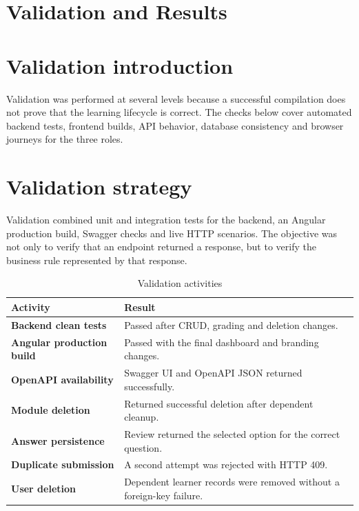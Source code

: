 \section{Validation and Results}
\section*{Validation introduction}
Validation was performed at several levels because a successful compilation
does not prove that the learning lifecycle is correct. The checks below cover
automated backend tests, frontend builds, API behavior, database consistency
and browser journeys for the three roles.

\section{Validation strategy}
Validation combined unit and integration tests for the backend, an Angular
production build, Swagger checks and live HTTP scenarios. The objective was
not only to verify that an endpoint returned a response, but to verify the
business rule represented by that response.

\begin{table}[H]\centering
\caption{Validation activities}\label{tab:validation}
\begin{tabularx}{\textwidth}{>{\bfseries}p{}X}
\toprule Activity & Result\\\midrule
Backend clean tests & Passed after CRUD, grading and deletion changes.\\
Angular production build & Passed with the final dashboard and branding changes.\\
OpenAPI availability & Swagger UI and OpenAPI JSON returned successfully.\\
Module deletion & Returned successful deletion after dependent cleanup.\\
Answer persistence & Review returned the selected option for the correct question.\\
Duplicate submission & A second attempt was rejected with HTTP 409.\\
User deletion & Dependent learner records were removed without a foreign-key failure.\\
\bottomrule
\end{tabularx}
\end{table}

